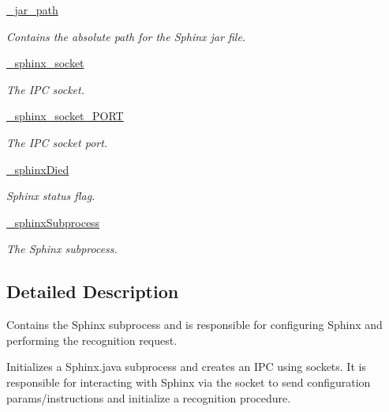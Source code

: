\begin{DoxyCompactItemize}
\hyperlink{classrapp__speech__detection__sphinx4_1_1sphinx4__wrapper_1_1Sphinx4Wrapper_af920761cb98e95d75da0585cf69f0245}{\-\_\-jar\-\_\-path}
\begin{DoxyCompactList}\small\item\em Contains the absolute path for the Sphinx jar file. \end{DoxyCompactList}\item 
\hyperlink{classrapp__speech__detection__sphinx4_1_1sphinx4__wrapper_1_1Sphinx4Wrapper_a99f828ccad07d66025d905bb2f42e2a0}{\-\_\-sphinx\-\_\-socket}
\begin{DoxyCompactList}\small\item\em The I\-P\-C socket. \end{DoxyCompactList}\item 
\hyperlink{classrapp__speech__detection__sphinx4_1_1sphinx4__wrapper_1_1Sphinx4Wrapper_a01d764c85e252be352a991b0cdea11eb}{\-\_\-sphinx\-\_\-socket\-\_\-\-P\-O\-R\-T}
\begin{DoxyCompactList}\small\item\em The I\-P\-C socket port. \end{DoxyCompactList}\item 
\hyperlink{classrapp__speech__detection__sphinx4_1_1sphinx4__wrapper_1_1Sphinx4Wrapper_a069497790b485de857733d8d5b6ba592}{\-\_\-sphinx\-Died}
\begin{DoxyCompactList}\small\item\em Sphinx status flag. \end{DoxyCompactList}\item 
\hyperlink{classrapp__speech__detection__sphinx4_1_1sphinx4__wrapper_1_1Sphinx4Wrapper_ace5cad8dbe7ccd9870d3dadc165cff0e}{\-\_\-sphinx\-Subprocess}
\begin{DoxyCompactList}\small\item\em The Sphinx subprocess. \end{DoxyCompactList}\end{DoxyCompactItemize}


\subsection{Detailed Description}
Contains the Sphinx subprocess and is responsible for configuring Sphinx and performing the recognition request. 

Initializes a Sphinx.\-java subprocess and creates an I\-P\-C using sockets. It is responsible for interacting with Sphinx via the socket to send configuration params/instructions and initialize a recognition procedure. 

